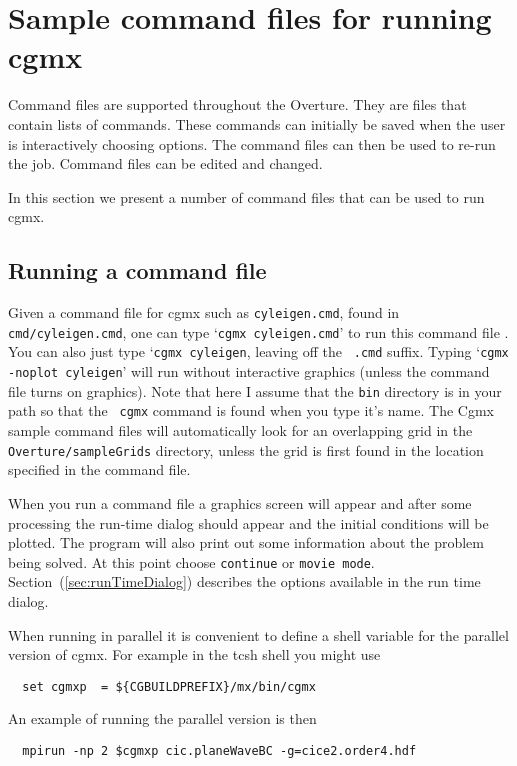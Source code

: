 \documentclass{article}
\newcommand{\Index}[1]{#1\index{#1}}
\begin{document}
\clearpage
\section{Sample command files for running cgmx} \label{sec:demo}

Command files are supported throughout the Overture. They are files
that contain lists of commands. These commands can initially be saved
when the user is interactively choosing options.  The \Index{command files}
can then be used to re-run the job. Command files can be edited and
changed.

In this section we present a number of command files that can be used
to run cgmx.

\subsection{Running a command file} \label{sec:runningCommandFiles} 

Given a \Index{command file} for cgmx such as {\tt cyleigen.cmd}, found in {\tt
cmd/cyleigen.cmd}, one can type `{\tt cgmx cyleigen.cmd}' to run this command
file . You can also just type `{\tt cgmx cyleigen}, leaving off the {\tt
.cmd} suffix. Typing `{\tt cgmx -noplot cyleigen}' will run without
interactive graphics (unless the command file turns on graphics). Note that here
I assume that the {\tt bin} directory is in your path so that the {\tt
cgmx} command is found when you type it's name. The Cgmx sample
command files will automatically look for an overlapping grid in the {\tt
Overture/sampleGrids} directory, unless the grid is first found in the location
specified in the command file.

When you run a command file a graphics screen will appear and after some
processing the run-time dialog should appear and the initial conditions will be
plotted. The program will also print out some information about the problem
being solved. At this point choose {\tt continue} or {\tt movie
mode}. Section~(\ref{sec:runTimeDialog}) describes the options available in the
run time dialog.

When running in parallel it is convenient to define a shell variable for the parallel
version of cgmx.
For example in the tcsh shell you might use
\begin{verbatim}
  set cgmxp  = ${CGBUILDPREFIX}/mx/bin/cgmx
\end{verbatim} %
An example of running the parallel version is then
\begin{verbatim}
  mpirun -np 2 $cgmxp cic.planeWaveBC -g=cice2.order4.hdf
\end{verbatim} %
\end{document}
